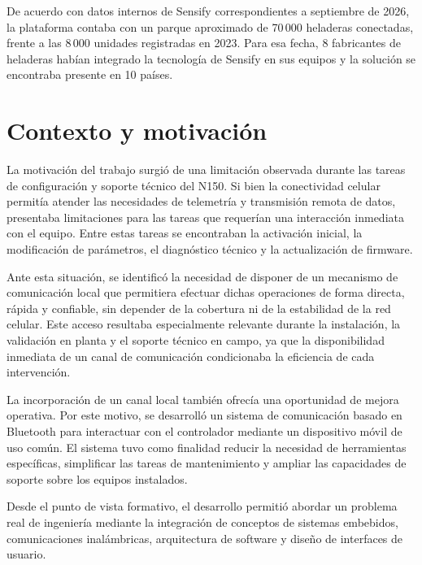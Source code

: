 De acuerdo con datos internos de Sensify correspondientes a septiembre de 2026, la plataforma contaba con un parque aproximado de 70\,000 heladeras conectadas, frente a las 8\,000 unidades registradas en 2023. Para esa fecha, 8 fabricantes de heladeras habían integrado la tecnología de Sensify en sus equipos y la solución se encontraba presente en 10 países.


\section{Contexto y motivación}

La motivación del trabajo surgió de una limitación observada durante las tareas de configuración y soporte técnico del N150. Si bien la conectividad celular permitía atender las necesidades de telemetría y transmisión remota de datos, presentaba limitaciones para las tareas que requerían una interacción inmediata con el equipo. Entre estas tareas se encontraban la activación inicial, la modificación de parámetros, el diagnóstico técnico y la actualización de firmware.

Ante esta situación, se identificó la necesidad de disponer de un mecanismo de comunicación local que permitiera efectuar dichas operaciones de forma directa, rápida y confiable, sin depender de la cobertura ni de la estabilidad de la red celular. Este acceso resultaba especialmente relevante durante la instalación, la validación en planta y el soporte técnico en campo, ya que la disponibilidad inmediata de un canal de comunicación condicionaba la eficiencia de cada intervención.

La incorporación de un canal local también ofrecía una oportunidad de mejora operativa. Por este motivo, se desarrolló un sistema de comunicación basado en Bluetooth para interactuar con el controlador mediante un dispositivo móvil de uso común. El sistema tuvo como finalidad reducir la necesidad de herramientas específicas, simplificar las tareas de mantenimiento y ampliar las capacidades de soporte sobre los equipos instalados.

Desde el punto de vista formativo, el desarrollo permitió abordar un problema real de ingeniería mediante la integración de conceptos de sistemas embebidos, comunicaciones inalámbricas, arquitectura de software y diseño de interfaces de usuario.


